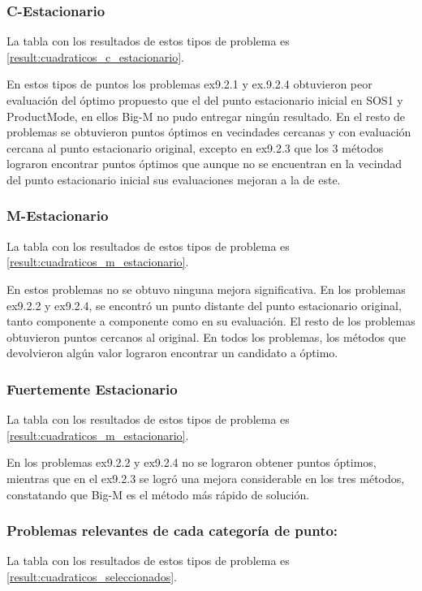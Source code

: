\subsubsection{C-Estacionario}   
La tabla con los resultados de estos tipos de problema es \ref{result:cuadraticos_c_estacionario}.

En estos tipos de puntos los problemas ex9.2.1 y ex.9.2.4 obtuvieron peor evaluación del óptimo propuesto que el del punto estacionario inicial en SOS1 y ProductMode, 
en ellos Big-M no pudo entregar ningún resultado. En el resto de problemas se obtuvieron puntos óptimos en vecindades cercanas y con evaluación cercana al punto estacionario original,
excepto en ex9.2.3 que los 3 métodos lograron encontrar puntos óptimos que aunque no se encuentran en la vecindad del punto estacionario inicial sus evaluaciones mejoran a la de este.


    
\subsubsection{M-Estacionario}
La tabla con los resultados de estos tipos de problema es \ref{result:cuadraticos_m_estacionario}.  

En estos problemas no se obtuvo ninguna mejora significativa. 
En los problemas ex9.2.2 y ex9.2.4, se encontró un punto distante del punto estacionario original, tanto componente a componente como en su evaluación. 
El resto de los problemas obtuvieron puntos cercanos al original. 
En todos los problemas, los métodos que devolvieron algún valor lograron encontrar un candidato a óptimo.
    
\subsubsection{Fuertemente Estacionario}
La tabla con los resultados de estos tipos de problema es \ref{result:cuadraticos_m_estacionario}.   

En los problemas ex9.2.2 y ex9.2.4 no se lograron obtener puntos óptimos, mientras que en el ex9.2.3 se logró una mejora considerable en los tres métodos, 
constatando que Big-M es el método más rápido de solución.

\subsubsection{Problemas relevantes de cada categoría de punto:}
La tabla con los resultados de estos tipos de problema es \ref{result:cuadraticos_seleccionados}.

